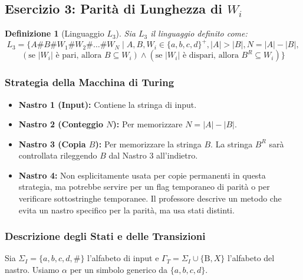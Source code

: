 \documentclass[a4paper]{article}
\newtheorem{definition}{Definizione}
\newcommand{\B}{\text{B}} %
\begin{document}
\subsection{Esercizio 3: Parità di Lunghezza di $W_i$}

\begin{definition}[Linguaggio $L_3$]
Sia $L_3$ il linguaggio definito come:
\[
L_3 = \{A\#B\#W_1 \# W_2 \# \dots \# W_N \mid A, B, W_i \in \{a,b,c,d\}^+, |A| > |B|, N = |A| - |B|, 
\]
$\qquad (\text{se } |W_i| \text{ è pari, allora } B \subseteq W_i) \land (\text{se } |W_i| \text{ è dispari, allora } B^R \subseteq W_i) \}$
\end{definition}

\subsubsection{Strategia della Macchina di Turing}
\begin{itemize}
    \item \textbf{Nastro 1 (Input):} Contiene la stringa di input.
    \item \textbf{Nastro 2 (Conteggio $N$):} Per memorizzare $N = |A| - |B|$.
    \item \textbf{Nastro 3 (Copia $B$):} Per memorizzare la stringa $B$. La stringa $B^R$ sarà controllata rileggendo $B$ dal Nastro 3 all'indietro.
    \item \textbf{Nastro 4:} Non esplicitamente usata per copie permanenti in questa strategia, ma potrebbe servire per un flag temporaneo di parità o per verificare sottostringhe temporanee. Il professore descrive un metodo che evita un nastro specifico per la parità, ma usa stati distinti.
\end{itemize}

\subsubsection{Descrizione degli Stati e delle Transizioni}
Sia $\Sigma_I = \{a,b,c,d,\#\}$ l'alfabeto di input e $\Gamma_T = \Sigma_I \cup \{\B, X\}$ l'alfabeto del nastro. Usiamo $\alpha$ per un simbolo generico da $\{a,b,c,d\}$.
\end{document}
